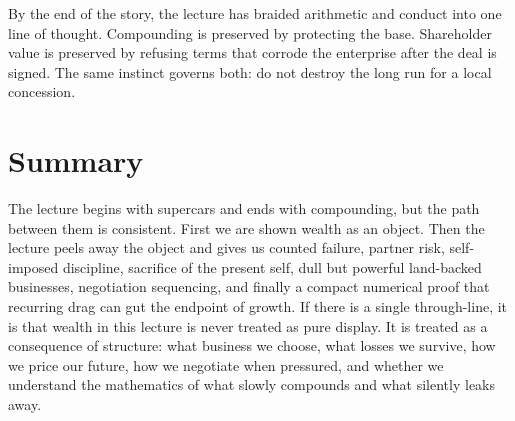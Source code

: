 By the end of the story, the lecture has braided arithmetic and conduct into one line of thought. Compounding is preserved by protecting the base. Shareholder value is preserved by refusing terms that corrode the enterprise after the deal is signed. The same instinct governs both: do not destroy the long run for a local concession.

\section{Summary}

The lecture begins with supercars and ends with compounding, but the path between them is consistent. First we are shown wealth as an object. Then the lecture peels away the object and gives us counted failure, partner risk, self-imposed discipline, sacrifice of the present self, dull but powerful land-backed businesses, negotiation sequencing, and finally a compact numerical proof that recurring drag can gut the endpoint of growth. If there is a single through-line, it is that wealth in this lecture is never treated as pure display. It is treated as a consequence of structure: what business we choose, what losses we survive, how we price our future, how we negotiate when pressured, and whether we understand the mathematics of what slowly compounds and what silently leaks away.